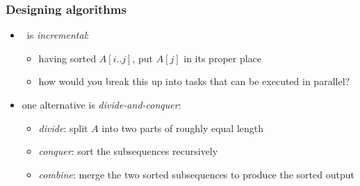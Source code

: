 \begin{frame}[fragile]
%
  \frametitle{Designing algorithms}
%
  \begin{itemize}
%
  \item \insertionsort\ is {\em incremental}:
    \begin{itemize}
      \item having sorted $A[i..j]$, put $A[j]$ in its proper place
      \item how would you break this up into tasks that can be executed in parallel?
    \end{itemize}
%
  \item one alternative is {\em divide-and-conquer}: \mergesort
    \begin{itemize}
      \item {\em divide}: split $A$ into two parts of roughly equal length
      \item {\em conquer}: sort the subsequences recursively
      \item {\em combine}: merge the two sorted subsequences to produce the sorted output
    \end{itemize}
%
  \end{itemize}
%
\end{frame}

